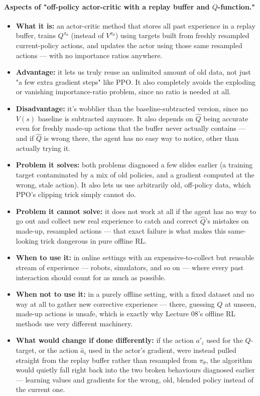 \documentclass[11pt]{article}
\begin{document}
\paragraph{Aspects of "off-policy actor-critic with a replay buffer and $Q$-function."}
\begin{itemize}[leftmargin=*]
  \item \textbf{What it is:} an actor-critic method that stores all past experience in a replay buffer, trains $Q^{\pi_\theta}$ (instead of $V^{\pi_\theta}$) using targets built from freshly resampled current-policy actions, and updates the actor using those same resampled actions --- with no importance ratios anywhere.
  \item \textbf{Advantage:} it lets us truly reuse an unlimited amount of old data, not just "a few extra gradient steps" like PPO. It also completely avoids the exploding or vanishing importance-ratio problem, since no ratio is needed at all.
  \item \textbf{Disadvantage:} it's wobblier than the baseline-subtracted version, since no $V(s)$ baseline is subtracted anymore. It also depends on $\hat Q$ being accurate even for freshly made-up actions that the buffer never actually contains --- and if $\hat Q$ is wrong there, the agent has no easy way to notice, other than actually trying it.
  \item \textbf{Problem it solves:} both problems diagnosed a few slides earlier (a training target contaminated by a mix of old policies, and a gradient computed at the wrong, stale action). It also lets us use arbitrarily old, off-policy data, which PPO's clipping trick simply cannot do.
  \item \textbf{Problem it cannot solve:} it does not work at all if the agent has no way to go out and collect new real experience to catch and correct $\hat Q$'s mistakes on made-up, resampled actions --- that exact failure is what makes this same-looking trick dangerous in pure offline RL.
  \item \textbf{When to use it:} in online settings with an expensive-to-collect but reusable stream of experience --- robots, simulators, and so on --- where every past interaction should count for as much as possible.
  \item \textbf{When not to use it:} in a purely offline setting, with a fixed dataset and no way at all to gather new corrective experience --- there, guessing $Q$ at unseen, made-up actions is unsafe, which is exactly why Lecture 08's offline RL methods use very different machinery.
  \item \textbf{What would change if done differently:} if the action $a'_i$ used for the $Q$-target, or the action $\bar a_i$ used in the actor's gradient, were instead pulled straight from the replay buffer rather than resampled from $\pi_\theta$, the algorithm would quietly fall right back into the two broken behaviours diagnosed earlier --- learning values and gradients for the wrong, old, blended policy instead of the current one.
\end{itemize}
\end{document}
